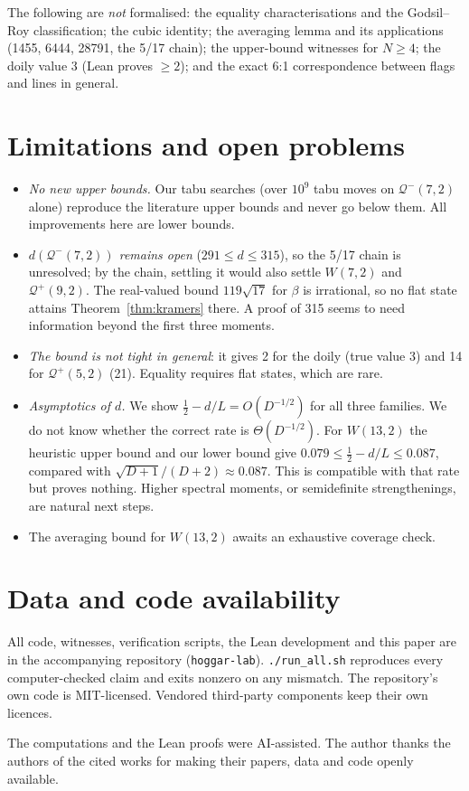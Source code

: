 \documentclass[aps,pra,onecolumn,11pt,superscriptaddress,nofootinbib]{revtex4-2}
\theoremstyle{definition}
\theoremstyle{remark}
\newcommand{\Qp}{\mathcal{Q}^{+}}
\newcommand{\Qm}{\mathcal{Q}^{-}}
\begin{document}
The following are \emph{not} formalised: the equality characterisations and the Godsil--Roy
classification; the cubic identity; the averaging lemma and its applications (1455, 6444,
28791, the 5/17 chain); the upper-bound witnesses for $N\ge4$; the doily value 3 (Lean proves
$\ge2$); and the exact 6:1 correspondence between flags and lines in general.

\section{Limitations and open problems}

\begin{itemize}
\item \emph{No new upper bounds.} Our tabu searches (over $10^9$ tabu moves on $\Qm(7,2)$ alone)
reproduce the literature upper bounds and never go below them. All improvements here are
lower bounds.
\item \emph{$d(\Qm(7,2))$ remains open} ($291\le d\le315$), so the 5/17 chain is unresolved;
by the chain, settling it would also settle $W(7,2)$ and $\Qp(9,2)$. The real-valued bound
$119\sqrt{17}$ for $\beta$ is irrational, so no flat state attains Theorem~\ref{thm:kramers}
there. A proof of 315 seems to need information beyond the first three moments.
\item \emph{The bound is not tight in general}: it gives 2 for the doily (true value 3) and 14
for $\Qp(5,2)$ (21). Equality requires flat states, which are rare.
\item \emph{Asymptotics of $d$.} We show $\tfrac12-d/L=O(D^{-1/2})$ for all three families. We do not know whether
the correct rate is $\Theta(D^{-1/2})$. For $W(13,2)$ the heuristic upper bound and our lower bound give
$0.079\le\tfrac12-d/L\le0.087$, compared with $\sqrt{D+1}/(D+2)\approx0.087$. This is
compatible with that rate but proves nothing. Higher spectral moments, or semidefinite strengthenings, are natural
next steps.
\item The averaging bound for $W(13,2)$ awaits an exhaustive coverage check.
\end{itemize}

\section*{Data and code availability}
All code, witnesses, verification scripts, the Lean development and this paper are in the
accompanying repository (\texttt{hoggar-lab}). \texttt{./run\_all.sh} reproduces every
computer-checked claim and exits nonzero on any mismatch. The repository's own code is
MIT-licensed. Vendored third-party components keep their own licences.

\begin{acknowledgments}
The computations and the Lean proofs were AI-assisted. The author thanks the authors of the
cited works for making their papers, data and code openly available.
\end{acknowledgments}


\end{document}
